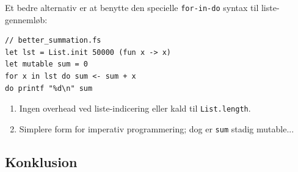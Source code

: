 \documentclass[rgb]{beamer}
\begin{document}
\begin{frame}[fragile]
\begin{footnotesize}

\vspace{2ex}

Et bedre alternativ er at benytte den specielle \lstinline{for-in-do}
syntax til liste-gennemløb:

\vspace{1ex}

\begin{lstlisting}[numbers=none,frame=none,mathescape]
// better_summation.fs
let lst = List.init 50000 (fun x -> x)
let mutable sum = 0
for x in lst do sum <- sum + x
do printf "%d\n" sum
\end{lstlisting}

\vspace{1ex}

\begin{enumerate}
\item Ingen overhead ved liste-indicering eller kald til \lstinline{List.length}.
\item Simplere form for imperativ programmering; dog er \lstinline{sum} stadig mutable...
\end{enumerate}
\end{footnotesize}
\end{frame}

\subsection*{Konklusion}
\begin{frame}[fragile]

  \vspace{3mm}
  \tableofcontents
\end{frame}
\end{document}
